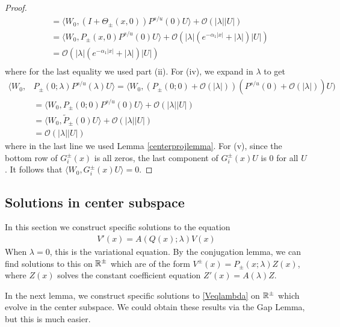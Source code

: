 \documentclass[thesis.tex]{subfiles}
\begin{document}
\begin{lemma}
\begin{proof}
\begin{align*}
&= \langle W_0, (I + \Theta_\pm(x, 0))P^{s/u}(0)U \rangle +
\mathcal{O}(|\lambda||U|) \\
&= \langle W_0, P_\pm(x, 0)P^{s/u}(0)U \rangle +
\mathcal{O}(|\lambda|( e^{-\alpha_1 |x|} + |\lambda|)|U|)\\
&= \mathcal{O}(|\lambda|( e^{-\alpha_1 |x|} + |\lambda|)|U|) \\
\end{align*}
where for the last equality we used part (ii). For (iv), we expand in $\lambda$ to get
\begin{align*}
\langle W_0, &P_\pm(0; \lambda)P^{s/u}(\lambda) U \rangle =
\langle W_0, (P_\pm(0; 0) + \mathcal{O}(|\lambda|))(P^{s/u}(0) + \mathcal{O}(|\lambda|)) U) \\
&= \langle W_0, P_\pm(0; 0) P^{s/u}(0)U \rangle + \mathcal{O}(|\lambda||U|) \\
&= \langle W_0, \tilde{P}_\pm(0) U \rangle + \mathcal{O}(|\lambda||U|) \\
&= \mathcal{O}(|\lambda||U|) 
\end{align*}
where in the last line we used Lemma \ref{centerprojlemma}. For (v), since the bottom row of $G_i^\pm(x)$ is all zeros, the last component of $G_i^\pm(x) U$ is 0 for all $U$. It follows that $\langle W_0, G_i^\pm(x) U\rangle = 0$. 
\end{proof}
\end{lemma}

\subsection{Solutions in center subspace}\label{sec:centersol}

In this section we construct specific solutions to the equation
\begin{align}
V'(x) = A(Q(x); \lambda) V(x) \label{Veqlambda}
\end{align}
When $\lambda = 0$, this is the variational equation. By the conjugation lemma, we can find solutions to this on $\mathbb{R}^\pm$ which are of the form $V^\pm(x) = P_\pm(x; \lambda)Z(x)$, where $Z(x)$ solves the constant coefficient equation $Z'(x) = A(\lambda)Z$.

In the next lemma, we construct specific solutions to \eqref{Veqlambda} on $\mathbb{R}^\pm$ which evolve in the center subspace. We could obtain these results via the Gap Lemma, but this is much easier.
\end{document}
